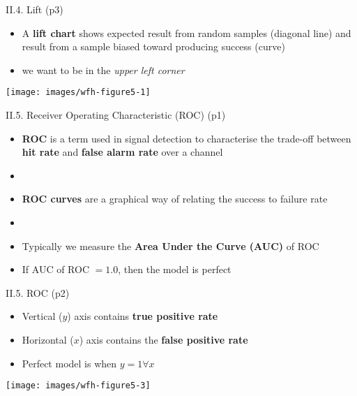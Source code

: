 \documentclass[handout]{beamer}
\newcommand{\strong}[1]{\textbf{\color{teal} #1}}
\newcommand{\stronger}[1]{\textbf{\color{purple} #1}}
\begin{document}
\begin{frame}{II.4. Lift (p3)}
\begin{itemize}
\item A \stronger{lift chart} shows expected result from random samples (diagonal line) and result from a sample biased toward producing success (curve)
\item we want to be in the \emph{upper left corner}\\
\end{itemize}
\begin{center}
\texttt{[image: images/wfh-figure5-1]}\\
\cite[Fig 5.1]{WFH3:2011}
\end{center}
\end{frame}
\begin{frame}{II.5. Receiver Operating Characteristic (ROC) (p1)}
\begin{itemize}
\item \stronger{ROC} is a term used in signal detection to characterise the trade-off between \strong{hit rate} and \strong{false alarm rate} over a channel
\item[]
\item \stronger{ROC curves} are a graphical way of relating the success to failure rate
\item[]
\item Typically we measure the \stronger{Area Under the Curve (AUC)} of ROC
\item If AUC of ROC $=1.0$, then the model is perfect
\end{itemize}
\end{frame}
\begin{frame}{II.5. ROC (p2)}
\begin{itemize}
\item Vertical ($y$) axis contains \strong{true positive rate}
\item Horizontal ($x$) axis contains the \strong{false positive rate}
\item Perfect model is when $y=1 \forall x$
\end{itemize}
\begin{center}
\texttt{[image: images/wfh-figure5-3]} \\
\cite[Fig 5.3]{WFH3:2011}
\end{center}
\end{frame}
\end{document}
